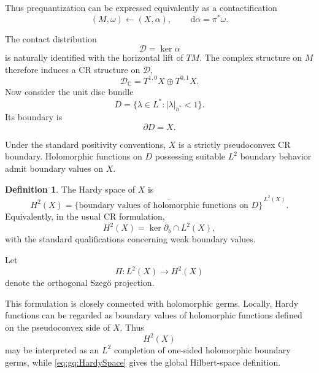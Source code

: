 \documentclass[a4paper,11pt]{article}
\theoremstyle{definition}
\newtheorem{definition}{Definition}[section]
\newcommand{\dd}{\,\mathrm{d}}
\begin{document}
Thus prequantization can be expressed equivalently as a contactification
\begin{equation}
    \boxed{
    (M,\omega)
    \longleftarrow
    (X,\alpha),
    \qquad
    \dd\alpha=\pi^*\omega.
    }
\end{equation}

The contact distribution
\begin{equation}
    \mathcal D=\ker\alpha
\end{equation}
is naturally identified with the horizontal lift of $TM$.  The complex
structure on $M$ therefore induces a CR structure on $\mathcal D$,
\begin{equation}
    \mathcal D_\mathbb C
    =
    T^{1,0}X
    \oplus
    T^{0,1}X.
\end{equation}
Now consider the unit disc bundle
\begin{equation}
    D
    =
    \{
       \lambda\in L^*:
       |\lambda|_{h^*}<1
    \}.
\end{equation}
Its boundary is
\begin{equation}
    \partial D=X.
\end{equation}

Under the standard positivity conventions, $X$ is a strictly pseudoconvex CR
boundary.  Holomorphic functions on $D$ possessing suitable $L^2$ boundary
behavior admit boundary values on $X$.

\begin{definition}
The Hardy space of $X$ is
\begin{equation}
    H^2(X)
    =
    \overline{
       \{
       \text{boundary values of holomorphic functions on }D
       \}
    }^{\,L^2(X)}.
    \label{eq:gq:HardySpace}
\end{equation}
Equivalently, in the usual CR formulation,
\begin{equation}
    H^2(X)
    =
    \ker\bar\partial_b
    \cap
    L^2(X),
\end{equation}
with the standard qualifications concerning weak boundary values.
\end{definition}

Let
\begin{equation}
    \Pi:
    L^2(X)\rightarrow H^2(X)
    \label{eq:gq:SzegoProjection}
\end{equation}
denote the orthogonal Szeg\H{o} projection.

This formulation is closely connected with holomorphic germs.  Locally, Hardy
functions can be regarded as boundary values of holomorphic functions defined
on the pseudoconvex side of $X$.  Thus
\begin{equation}
    H^2(X)
\end{equation}
may be interpreted as an $L^2$ completion of one-sided holomorphic boundary
germs, while \eqref{eq:gq:HardySpace} gives the global Hilbert-space
definition.
\end{document}

